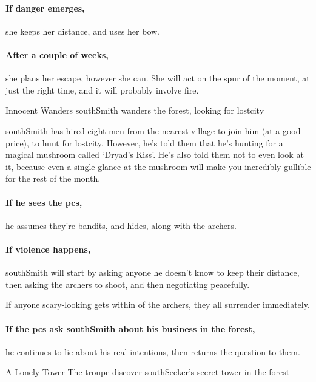 \paragraph{If danger emerges,}
she keeps her distance, and uses her bow.

\paragraph{After a couple of weeks,}
she plans her escape, however she can.
She will act on the spur of the moment, at just the right time, and it will probably involve fire.

{Innocent Wanders}%
{\Gls{southSmith} wanders the forest, looking for \gls{lostcity}}%

\Gls{southSmith} has hired eight men from the nearest \gls{village} to join him (at a good price), to hunt for \gls{lostcity}.
However, he's told them that he's hunting for a magical mushroom called `Dryad's Kiss'.%
He's also told them not to even look at it, because even a single glance at the mushroom will make you incredibly gullible for the rest of the month.

\southSmith

\paragraph{If he sees the \glspl{pc},}
he assumes they're bandits, and hides, along with the archers.


\paragraph{If violence happens,}
\gls{southSmith} will start by asking anyone he doesn't know to keep their distance, then asking the archers to shoot, and then negotiating peacefully.

If anyone scary-looking gets within  of the archers, they all surrender immediately.

\paragraph{If the \glspl{pc} ask \gls{southSmith} about his business in the forest,}
he continues to lie about his real intentions, then returns the question to them.

{A Lonely Tower}%
{The troupe discover \gls{southSeeker}'s secret tower in the forest}%

